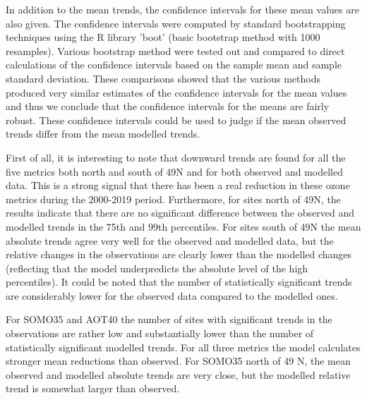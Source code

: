 In addition to the mean trends, the confidence intervals for these mean values are also given. The confidence intervals were computed by standard bootstrapping techniques \citep{DavisonHinkley:1997} using the R library 'boot' (basic bootstrap method with 1000 resamples). Various bootstrap method were tested out and compared to direct calculations of the confidence intervals based on the sample mean and sample standard deviation. These comparisons showed that the various methods produced very similar estimates of the confidence intervals for the mean values and thus we conclude that the confidence intervals for the means are fairly robust. These confidence intervals could be used to judge if the mean observed trends differ from the mean modelled trends.



First of all, it is interesting to note that downward trends are found for all the five metrics both north and south of 49\degrees N and for both observed and modelled data. This is a strong signal that there has been a real reduction in these ozone metrics during the 2000-2019 period. Furthermore, for sites north of 49\degrees N, the results indicate that there are no significant difference between the observed and modelled trends in the 75th and 99th percentiles. For sites south of 49\degrees N the mean absolute trends agree very well for the observed and modelled data, but the relative changes in the observations are clearly lower than the modelled changes (reflecting that the model underpredicts the absolute level of the high percentiles). It could be noted that the number of statistically significant trends are considerably lower for the observed data compared to the modelled ones. 

For SOMO35 and AOT40 the number of sites with significant trends in the observations are rather low and substantially lower than the number of statistically significant modelled trends. For all three metrics the model calculates stronger mean reductions than observed. For SOMO35 north of 49 \degrees N, the mean observed and modelled absolute trends are very close, but the modelled relative trend is somewhat larger than observed.




